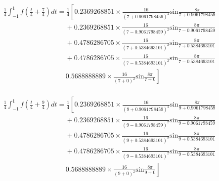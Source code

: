 \documentclass[a4paper]{article}
\begin{document}
\begin{spacing}{1.5}
\begin{CJK*}{GBK}{song}
\begin{equation}
\begin{split}
& \frac{1}{4}\int_{-1}^1 f\left(\frac{t}{4} + \frac{7}{4}\right)dt = \frac{1}{4}\left[0.2369268851 \times \frac{16}{(7+0.9061798459)^2}\text{sin}\frac{8\pi}{7+0.9061798459}\right.\\
& \quad \quad  \quad \quad \quad  \quad \quad \quad  \quad+ 0.2369268851 \times \frac{16}{(7-0.9061798459 )^2}\text{sin}\frac{8\pi}{7-0.9061798459} \\
& \quad \quad  \quad \quad \quad  \quad  \quad \quad  \quad+0.4786286705 \times \frac{16}{(7+0.5384693101)^2}\text{sin}\frac{8\pi}{7+0.5384693101} \\
& \quad \quad  \quad \quad \quad  \quad \quad \quad  \quad+ 0.4786286705\times  \frac{16}{(7-0.5384693101)^2}\text{sin}\frac{8\pi}{7-0.5384693101} \\
&\quad \quad  \quad \quad \quad  \quad\quad \quad  \quad \left.0.5688888889\times \frac{16}{(7+0)^2}\text{sin}\frac{8\pi}{7+0}\right] \\
\end{split}
\end{equation}

\begin{equation}
\begin{split}
& \frac{1}{4}\int_{-1}^1 f\left(\frac{t}{4} + \frac{9}{4}\right)dt = \frac{1}{4}\left[0.2369268851 \times \frac{16}{(9+0.9061798459)^2}\text{sin}\frac{8\pi}{9+0.9061798459}\right.\\
& \quad \quad  \quad \quad \quad  \quad \quad \quad  \quad+ 0.2369268851 \times \frac{16}{(9-0.9061798459 )^2}\text{sin}\frac{8\pi}{9-0.9061798459} \\
& \quad \quad  \quad \quad \quad  \quad  \quad \quad  \quad+0.4786286705 \times \frac{16}{(9+0.5384693101)^2}\text{sin}\frac{8\pi}{9+0.5384693101} \\
& \quad \quad  \quad \quad \quad  \quad \quad \quad  \quad+ 0.4786286705\times  \frac{16}{(9-0.5384693101)^2}\text{sin}\frac{8\pi}{9-0.5384693101} \\
&\quad \quad  \quad \quad \quad  \quad\quad \quad  \quad \left.0.5688888889\times \frac{16}{(9+0)^2}\text{sin}\frac{8\pi}{9+0}\right] \\
\end{split}
\end{equation}


\end{CJK*}
\end{spacing}
\end{document}
